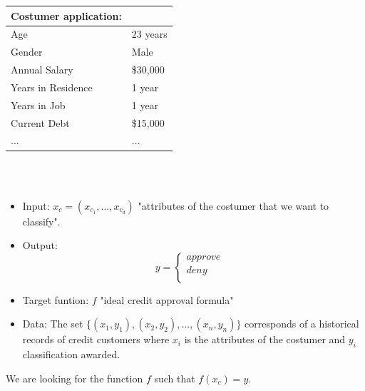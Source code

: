 \documentclass[../main.tex]{subfiles}
\begin{document}
\begin{tabular}{ll}
	\toprule
	\textbf{Costumer application:}  \\ 
	\midrule
	Age & 23 years \\
	Gender & Male \\
	Annual Salary & \$30,000 \\
	Years in Residence & 1 year \\
	Years in Job & 1 year \\
	Current Debt & \$15,000 \\
	... & ... \\
	\bottomrule
\end{tabular} 
\\ \\
\begin{itemize}
\item Input: \textbf{$x_c=(x_{c_1},...,x_{c_d})$}  "attributes of the costumer that we want to classify". 
\item Output:  
\[
y = \begin{cases}
	approve \\
	deny& \\
\end{cases}
\]

\item Target funtion: $f$  "ideal credit approval formula"
\item Data: The set $\{(x_1, y_1),(x_2,y_2),...,(x_n ,y_n)\}$ corresponds of a historical records of credit customers where $x_i$ is the attributes of the costumer and $y_i$ classification awarded.
\end{itemize}

\noindent We are looking for the function $f$ such that $f(x_c)=y$.
\\ \\ 
\end{document}
